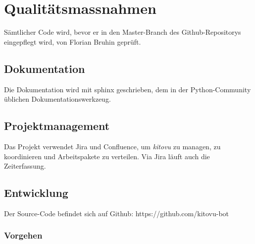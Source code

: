 \documentclass[a4paper]{article}
\begin{document}
\section{Qualitätsmassnahmen}
%
Sämtlicher Code wird, bevor er in den Master-Branch des Github-Repositorys eingepflegt wird, von Florian Bruhin geprüft.

\subsection{Dokumentation}
Die Dokumentation wird mit sphinx geschrieben, dem in der Python-Community üblichen Dokumentationswerkzeug.
\subsection{Projektmanagement}
Das Projekt verwendet Jira und Confluence, um \emph{kitovu} zu managen, zu koordinieren und Arbeitspakete zu verteilen. Via Jira läuft auch die Zeiterfassung.

\subsection{Entwicklung}
Der Source-Code befindet sich auf Github: https://github.com/kitovu-bot

\subsubsection{Vorgehen}
\end{document}
